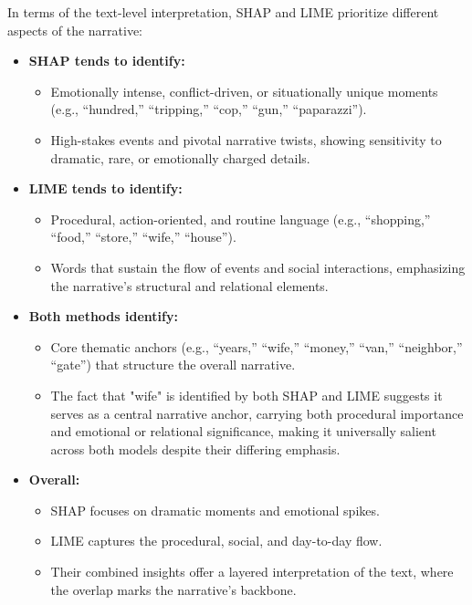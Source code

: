 In terms of the text-level interpretation, SHAP and LIME prioritize different aspects of the narrative:

\begin{itemize}
    \item \textbf{SHAP tends to identify:}
    \begin{itemize}
        \item Emotionally intense, conflict-driven, or situationally unique moments (e.g., ``hundred,'' ``tripping,'' ``cop,'' ``gun,'' ``paparazzi'').
        \item High-stakes events and pivotal narrative twists, showing sensitivity to dramatic, rare, or emotionally charged details.
    \end{itemize}

    \item \textbf{LIME tends to identify:}
    \begin{itemize}
        \item Procedural, action-oriented, and routine language (e.g., ``shopping,'' ``food,'' ``store,'' ``wife,'' ``house'').
        \item Words that sustain the flow of events and social interactions, emphasizing the narrative's structural and relational elements.
    \end{itemize}

    \item \textbf{Both methods identify:}
    \begin{itemize}
        \item Core thematic anchors (e.g., ``years,''  ``wife,''  ``money,'' ``van,'' ``neighbor,'' ``gate'') that structure the overall narrative.
        \item The fact that "wife" is identified by both SHAP and LIME suggests it serves as a central narrative anchor, carrying both procedural importance and emotional or relational significance, making it universally salient across both models despite their differing emphasis.
    \end{itemize}

    \item \textbf{Overall:}
    \begin{itemize}
        \item SHAP focuses on dramatic moments and emotional spikes.
        \item LIME captures the procedural, social, and day-to-day flow.
        \item Their combined insights offer a layered interpretation of the text, where the overlap marks the narrative's backbone.
    \end{itemize}
\end{itemize}
